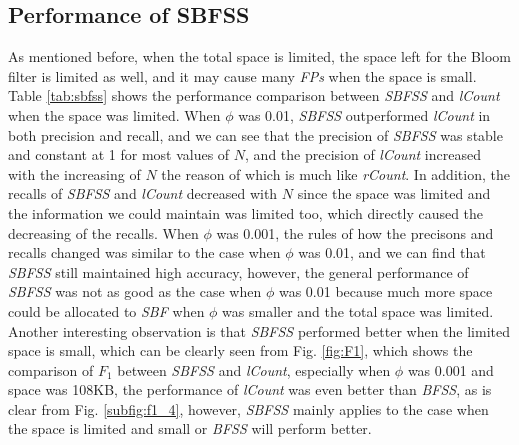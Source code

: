\documentclass[conference]{IEEEtran}
\begin{document}
\subsection{Performance of SBFSS}
As mentioned before, when the total space is limited, the space left for the Bloom filter is limited as well, and it may cause many \emph{FPs} when the space is small. Table \ref{tab:sbfss} shows the performance comparison between \emph{SBFSS} and \emph{lCount} when the space was limited. When $\phi$ was 0.01, \emph{SBFSS} outperformed \emph{lCount} in both precision and recall, and we can see that the precision of \emph{SBFSS} was stable and constant at 1 for most values of $N$, and the precision of \emph{lCount} increased with the increasing of $N$ the reason of which is much like \emph{rCount}. In addition, the recalls of \emph{SBFSS} and \emph{lCount} decreased with $N$ since the space was limited and the information we could maintain was limited too, which directly caused the decreasing of the recalls. When $\phi$ was 0.001, the rules of how the precisons and recalls changed was similar to the case when $\phi$ was 0.01, and we can find that \emph{SBFSS} still maintained high accuracy, however, the general performance of \emph{SBFSS} was not as good as the case when $\phi$ was 0.01 because much more space could be allocated to \emph{SBF} when $\phi$ was smaller and the total space was limited. Another interesting observation is that \emph{SBFSS} performed better when the limited space is small, which can be clearly seen from Fig. \ref{fig:F1}, which shows the comparison of $F_1$ between \emph{SBFSS} and \emph{lCount}, especially when $\phi$ was 0.001 and space was 108KB, the performance of \emph{lCount} was even better than \emph{BFSS}, as is clear from Fig. \ref{subfig:f1_4}, however, \emph{SBFSS} mainly applies to the case when the space is limited and small or \emph{BFSS} will perform better. 
%
%
\end{document}
